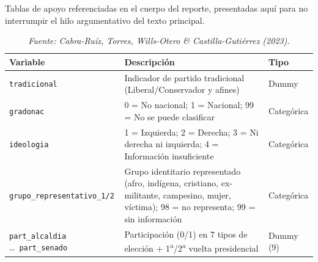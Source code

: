 \documentclass[11pt,letterpaper]{article}
\newcommand{\code}[1]{\texttt{\small #1}}
\begin{document}
\noindent Tablas de apoyo referenciadas en el cuerpo del reporte, presentadas aquí para no interrumpir el hilo argumentativo del texto principal.

\begin{table}[htbp]
\centering
\footnotesize
\caption{Variables utilizadas en el modelo}
\label{tab:A1}
\begin{tabular}{@{}p{3.4cm}p{8.5cm}p{1.4cm}@{}}
\toprule
Variable & Descripción & Tipo \\
\midrule
\code{tradicional} & Indicador de partido tradicional (Liberal/Conservador y afines) & Dummy \\
\code{gradonac} & 0 = No nacional; 1 = Nacional; 99 = No se puede clasificar & Categórica \\
\code{ideologia} & 1 = Izquierda; 2 = Derecha; 3 = Ni derecha ni izquierda; 4 = Información insuficiente & Categórica \\
\code{grupo\_re\-pre\-sen\-ta\-ti\-vo\_1/2} & Grupo identitario representado (afro, indígena, cristiano, ex-militante, campesino, mujer, víctima); 98 = no representa; 99 = sin información & Categórica \\
\code{part\_alcaldia} \ldots\ \code{part\_senado} & Participación (0/1) en 7 tipos de elección + 1\textsuperscript{a}/2\textsuperscript{a} vuelta presidencial & Dummy (9) \\
\bottomrule
\end{tabular}
\vspace{0.3em}
\caption*{\footnotesize\color{mutedgray}\itshape Fuente: Cabra-Ruíz, Torres, Wills-Otero \& Castilla-Gutiérrez (2023).}
\end{table}
\end{document}
